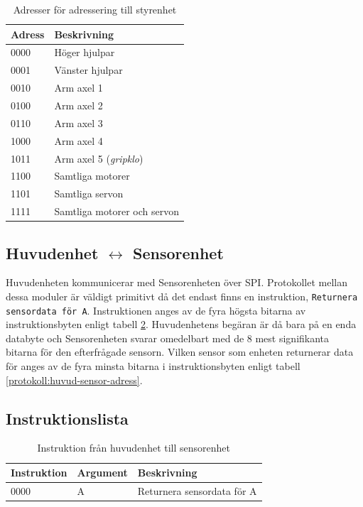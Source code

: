 \begin{table}[h!]
	\centering
	\begin{tabularx}{\textwidth}{| l | X |}
		\hline
		\textbf{Adress} & \textbf{Beskrivning} \\\hline
		{0000} & {Höger hjulpar} \\\hline
		{0001} & {Vänster hjulpar} \\\hline
		{0010} & {Arm axel 1} \\\hline
		{0100} & {Arm axel 2} \\\hline
		{0110} & {Arm axel 3} \\\hline
		{1000} & {Arm axel 4} \\\hline
		{1011} & {Arm axel 5 (\textit{gripklo})} \\\hline
		{1100} & {Samtliga motorer} \\\hline
		{1101} & {Samtliga servon} \\\hline
		{1111} & {Samtliga motorer och servon} \\\hline
	\end{tabularx}
	\caption{Adresser för adressering till styrenhet} \label{protokoll:pc-motor-adress-tabell}
\end{table}

\subsection{Huvudenhet $\longleftrightarrow$ Sensorenhet}

Huvudenheten kommunicerar med Sensorenheten över SPI. Protokollet mellan dessa moduler är väldigt primitivt då det endast finns en instruktion, \texttt{Returnera sensordata för A}. Instruktionen anges av de fyra högsta bitarna av instruktionsbyten enligt tabell \ref{protokoll:huvud-sensor}. Huvudenhetens begäran är då bara på en enda databyte och Sensorenheten svarar omedelbart med de 8 mest signifikanta bitarna för den efterfrågade sensorn. Vilken sensor som enheten returnerar data för anges av de fyra minsta bitarna i instruktionsbyten enligt tabell \ref{protokoll:huvud-sensor-adress}.


\subsection{Instruktionslista}

\begin{table}[h!]
	\centering
	\begin{tabularx}{\textwidth}{| l | l | X |}
		\hline
		\textbf{Instruktion} & \textbf{Argument} & \textbf{Beskrivning} \\\hline
		{0000} & {A} & {Returnera sensordata för A} \\\hline
	\end{tabularx}
	\caption{Instruktion från huvudenhet till sensorenhet} \label{protokoll:huvud-sensor}
\end{table}

